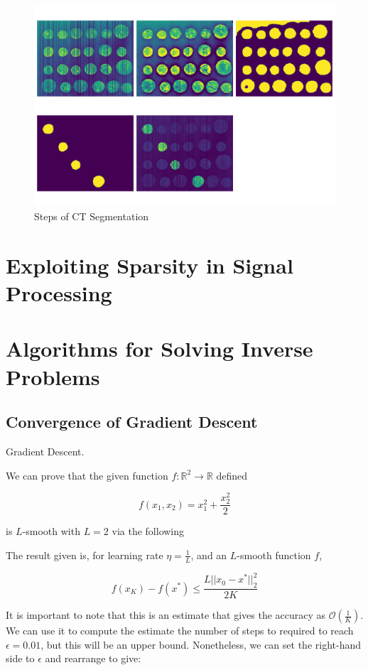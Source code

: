 \documentclass[12pt]{article}
\begin{document}
\begin{figure}[hp]
    \includegraphics[scale=0.35]{figures/coins_segmentation.png}
    \caption{Steps of CT Segmentation}
    \label{fig:coins}
\end{figure}

\section{Exploiting Sparsity in Signal Processing}



\section{Algorithms for Solving Inverse Problems}
\subsection{Convergence of Gradient Descent}

Gradient Descent.

We can prove that the given function $f:\mathbb{R}^2\rightarrow\mathbb{R}$ defined

\[f(x_1,x_2) = x_1^2 + \frac{x_2^2}{2}\]

is $L$-smooth with $L=2$ via the following

The result given is, for learning rate $\eta=\frac{1}{L}$, and an $L$-smooth function $f$,

\[f(x_K) - f(x^*) \leq \frac{L||x_0-x^*||_2^2}{2K}\]

It is important to note that this is an estimate that gives the accuracy as $\mathcal{O}(\frac{1}{K})$.
We can use it to compute the estimate the number of steps to required to reach $\epsilon=0.01$,
but this will be an upper bound.
Nonetheless, we can set the right-hand side to $\epsilon$ and rearrange to give:
\end{document}

